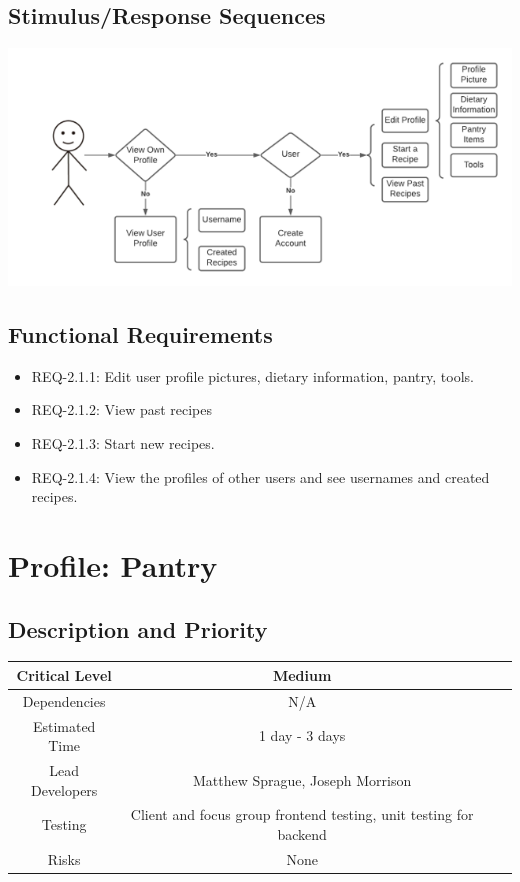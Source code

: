 \documentclass{scrreprt}
\begin{document}
\subsection{Stimulus/Response Sequences}

\includegraphics{FlowCharts/Profile-Profile.png}

\subsection{Functional Requirements}

\begin{itemize}
    \item REQ-2.1.1: Edit user profile pictures, dietary information, pantry, tools.
    \item REQ-2.1.2: View past recipes 
    \item REQ-2.1.3: Start new recipes.
    \item REQ-2.1.4: View the profiles of other users and see usernames and created recipes.    
\end{itemize}

\section{Profile: Pantry}

\subsection{Description and Priority}
\begin{center}
    \begin{tabular}{| c | c | c | c |}
        \hline
        Critical Level & Medium \\
        \hline
        Dependencies & N/A \\
        \hline
        Estimated Time & 1 day - 3 days \\
        \hline
        Lead Developers & Matthew Sprague, Joseph Morrison \\
        \hline
        Testing & Client and focus group frontend testing, unit testing for backend \\
        \hline
        Risks & None \\
        \hline
    \end{tabular}
\end{center}
\end{document}

